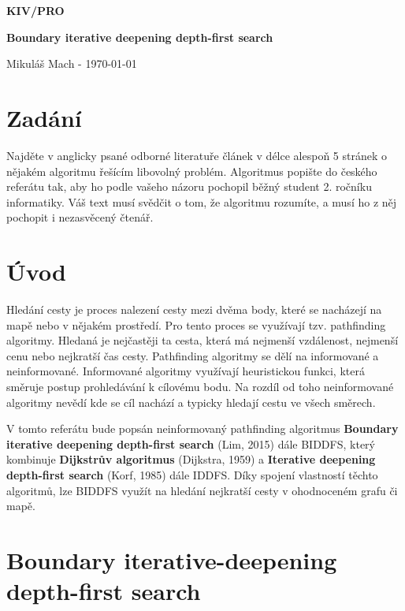 \documentclass[12pt]{report}
\begin{document}
	{\centering
		
		\vspace{15mm}
		
		{\Huge\bfseries KIV/PRO}
		
		{\Huge\bfseries Boundary iterative deepening depth-first search}
		
		{\LARGE Mikuláš Mach - \today}
		\vspace{15mm}
		
	}
	
	\section*{Zadání}
	
	Najděte v anglicky psané odborné literatuře článek v délce alespoň 5 stránek o nějakém 
	algoritmu řešícím libovolný problém. Algoritmus popište do českého referátu tak, aby ho 
	podle vašeho názoru pochopil běžný student 2. ročníku informatiky. Váš text musí svědčit o 
	tom, že algoritmu rozumíte, a musí ho z něj pochopit i nezasvěcený čtenář. 
	
	
	\section*{Úvod}
	
	Hledání cesty je proces nalezení cesty mezi dvěma body, které se nacházejí na mapě nebo v nějakém prostředí.
	Pro tento proces se využívají tzv. pathfinding algoritmy. Hledaná je nejčastěji ta cesta, která má nejmenší vzdálenost, nejmenší cenu nebo nejkratší čas cesty. Pathfinding algoritmy se dělí na informované a neinformované. Informované algoritmy využívají heuristickou funkci, která směruje postup prohledávání k cílovému bodu. Na rozdíl od toho neinformované algoritmy nevědí kde se cíl nachází a typicky hledají cestu ve všech směrech.
	
	V tomto referátu bude popsán neinformovaný pathfinding algoritmus \textbf{Boundary iterative deepening depth-first search} (Lim, 2015) dále BIDDFS, který kombinuje \textbf{Dijkstrův algoritmus} (Dijkstra, 1959) a \textbf{Iterative deepening depth-first search} (Korf, 1985) dále IDDFS. Díky spojení vlastností těchto algoritmů, lze BIDDFS využít na hledání nejkratší cesty v ohodnoceném grafu či mapě.
	
	\newpage
	
	\section*{Boundary iterative-deepening depth-first search}
	
\end{document}
